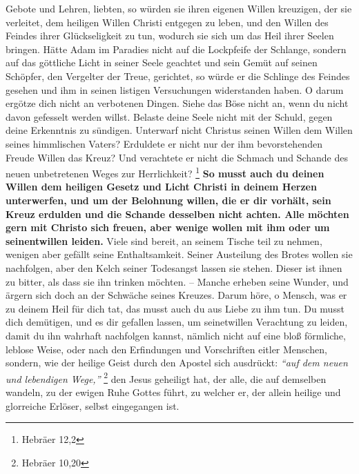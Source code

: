 Gebote und Lehren, liebten, so würden sie ihren eigenen Willen kreuzigen, der
sie verleitet, dem heiligen Willen Christi entgegen zu leben, und den Willen des
Feindes ihrer Glückseligkeit zu tun, wodurch sie sich um das Heil ihrer Seelen
bringen. Hätte Adam im Paradies nicht auf die Lockpfeife der Schlange, sondern
auf das göttliche Licht in seiner Seele geachtet und sein Gemüt auf seinen
Schöpfer, den Vergelter der Treue, gerichtet, so würde er die Schlinge des
Feindes gesehen und ihm in seinen listigen Versuchungen widerstanden haben. O
darum ergötze dich nicht an verbotenen Dingen. Siehe das Böse nicht an, wenn du
nicht davon gefesselt werden willst. Belaste deine Seele nicht mit der Schuld,
gegen deine Erkenntnis zu sündigen. Unterwarf nicht Christus seinen Willen dem
Willen seines himmlischen Vaters? Erduldete er nicht nur der ihm bevorstehenden
Freude Willen das Kreuz? Und verachtete er nicht die Schmach und Schande des
neuen unbetretenen Weges zur Herrlichkeit?
\footnote{Hebräer 12,2}
\textbf{So musst
auch du
deinen Willen dem heiligen Gesetz und Licht Christi in deinem Herzen
unterwerfen, und um der Belohnung willen, die er dir vorhält, sein Kreuz
erdulden und die Schande desselben nicht achten. Alle möchten gern mit Christo
sich freuen, aber wenige wollen mit ihm oder um seinentwillen leiden.} Viele
sind
bereit, an seinem Tische teil zu nehmen, wenigen aber gefällt seine
Enthaltsamkeit. Seiner Austeilung des Brotes wollen sie nachfolgen, aber den
Kelch seiner Todesangst lassen sie stehen. Dieser ist ihnen zu bitter, als dass
sie ihn trinken möchten. -- Manche erheben seine Wunder, und ärgern sich doch an
der Schwäche seines Kreuzes. Darum höre, o Mensch, was er zu deinem Heil für
dich tat, das musst auch du aus Liebe zu ihm tun. Du musst dich demütigen, und
es dir gefallen lassen, um seinetwillen Verachtung zu leiden, damit du ihn
wahrhaft nachfolgen kannst, nämlich nicht auf eine bloß förmliche, leblose
Weise, oder nach den Erfindungen und Vorschriften eitler Menschen, sondern, wie
der heilige Geist durch den Apostel sich ausdrückt:
\textit{"`auf dem neuen und
lebendigen Wege,"'}
\footnote{Hebräer 10,20}
den Jesus geheiligt hat, der alle, die
auf demselben wandeln, zu der ewigen Ruhe Gottes führt, zu welcher er, der
allein heilige und glorreiche Erlöser, selbst eingegangen ist.



